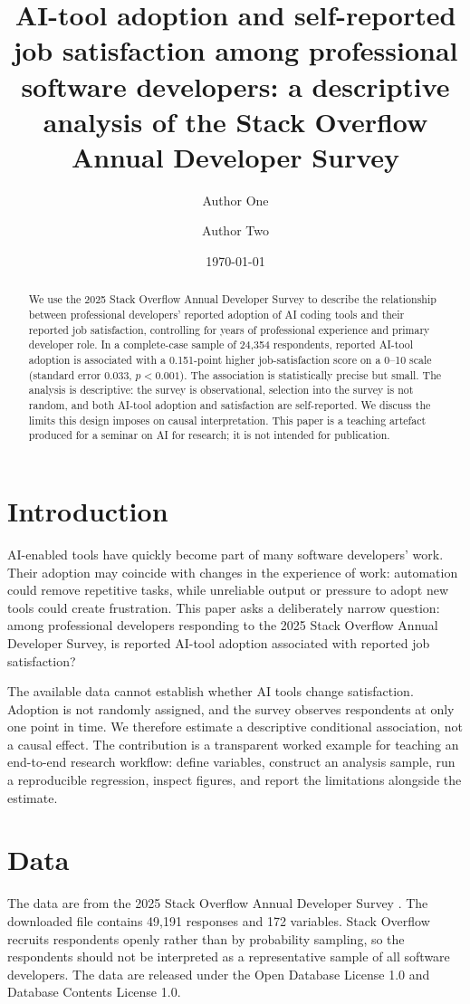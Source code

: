 \documentclass[11pt]{article}
\title{AI-tool adoption and self-reported job satisfaction among professional
software developers: a descriptive analysis of the Stack Overflow Annual
Developer Survey}
\author[1]{Author One}
\author[1]{Author Two}
\affil[1]{Universidade Cat\'olica Portuguesa}
\date{\today}
\begin{document}
\maketitle

\begin{abstract}
We use the 2025 Stack Overflow Annual Developer Survey to describe the
relationship between professional developers' reported adoption of AI coding
tools and their reported job satisfaction, controlling for years of
professional experience and primary developer role. In a complete-case sample
of 24,354 respondents, reported AI-tool adoption is associated with a 0.151-point
higher job-satisfaction score on a 0--10 scale (standard error 0.033,
$p<0.001$). The association is statistically precise but small. The analysis is descriptive: the
survey is observational, selection into the survey is not random, and
both AI-tool adoption and satisfaction are self-reported. We discuss the
limits this design imposes on causal interpretation. This paper is a
teaching artefact produced for a seminar on AI for research; it is not
intended for publication.
\end{abstract}

\section{Introduction}
AI-enabled tools have quickly become part of many software developers' work.
Their adoption may coincide with changes in the experience of work: automation
could remove repetitive tasks, while unreliable output or pressure to adopt new
tools could create frustration. This paper asks a deliberately narrow question:
among professional developers responding to the 2025 Stack Overflow Annual
Developer Survey, is reported AI-tool adoption associated with reported job
satisfaction?

The available data cannot establish whether AI tools change satisfaction.
Adoption is not randomly assigned, and the survey observes respondents at only
one point in time. We therefore estimate a descriptive conditional association,
not a causal effect. The contribution is a transparent worked example for
teaching an end-to-end research workflow: define variables, construct an
analysis sample, run a reproducible regression, inspect figures, and report the
limitations alongside the estimate.

\section{Data}
The data are from the 2025 Stack Overflow Annual Developer Survey
\citep{stackoverflow2025survey}. The downloaded file contains 49,191 responses
and 172 variables. Stack Overflow recruits respondents openly rather than by
probability sampling, so the respondents should not be interpreted as a
representative sample of all software developers. The data are released under
the Open Database License 1.0 and Database Contents License 1.0.
\end{document}
